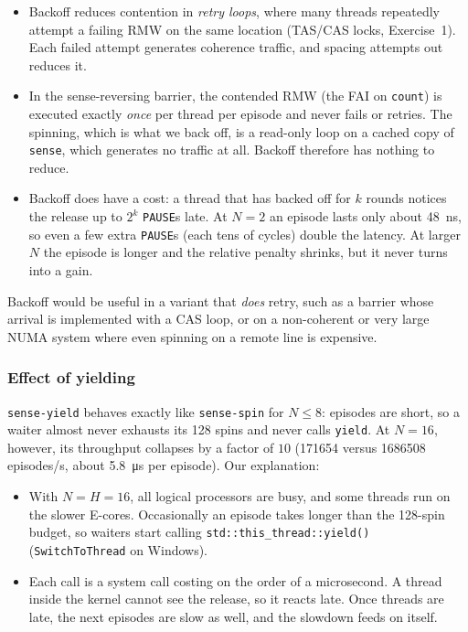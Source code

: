 \begin{itemize}
    \item Backoff reduces contention in \emph{retry loops}, where many
          threads repeatedly attempt a failing RMW on the same location
          (TAS/CAS locks, Exercise~1). Each failed attempt generates
          coherence traffic, and spacing attempts out reduces it.
    \item In the sense-reversing barrier, the contended RMW (the FAI on
          \texttt{count}) is executed exactly \emph{once} per thread per
          episode and never fails or retries. The spinning, which is what
          we back off, is a read-only loop on a cached copy of
          \texttt{sense}, which generates no traffic at all. Backoff
          therefore has nothing to reduce.
    \item Backoff does have a cost: a thread that has backed off for $k$
          rounds notices the release up to $2^{k}$ \texttt{PAUSE}s late. At
          $N=2$ an episode lasts only about \SI{48}{\nano\second}, so even a
          few extra \texttt{PAUSE}s (each tens of cycles) double the
          latency. At larger $N$ the episode is longer and the relative
          penalty shrinks, but it never turns into a gain.
\end{itemize}

Backoff would be useful in a variant that \emph{does} retry, such as a
barrier whose arrival is implemented with a CAS loop, or on a non-coherent
or very large NUMA system where even spinning on a remote line is
expensive.

\subsubsection{Effect of yielding}

\texttt{sense-yield} behaves exactly like \texttt{sense-spin} for $N \leq 8$:
episodes are short, so a waiter almost never exhausts its 128 spins and
never calls \texttt{yield}. At $N=16$, however, its throughput collapses by
a factor of $10$ (\num{171654} versus \num{1686508} episodes/s, about
\SI{5.8}{\micro\second} per episode). Our explanation:

\begin{itemize}
    \item With $N = H = 16$, all logical processors are busy, and some
          threads run on the slower E-cores. Occasionally an episode takes
          longer than the 128-spin budget, so waiters start calling
          \texttt{std::this\_thread::yield()} (\texttt{SwitchToThread} on
          Windows).
    \item Each call is a system call costing on the order of a
          microsecond. A thread inside the kernel cannot see the release, so
          it reacts late. Once threads are late, the next episodes are slow
          as well, and the slowdown feeds on itself.
\end{itemize}

